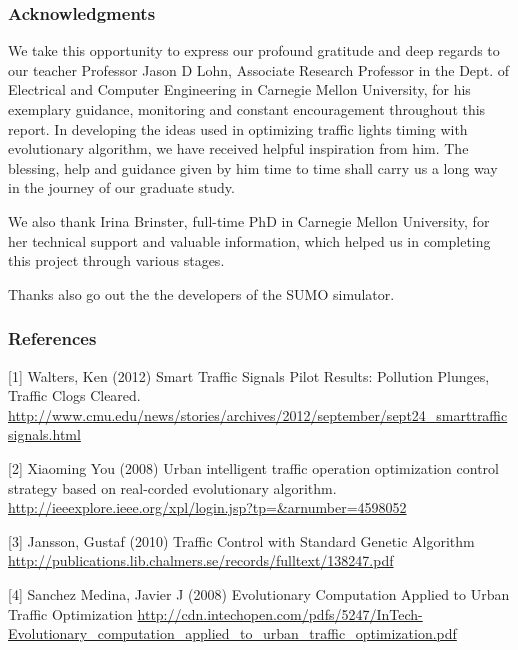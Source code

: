 \documentclass{article} %
\begin{document}
\subsubsection*{Acknowledgments}

We take this opportunity to express our profound gratitude and deep regards to our teacher Professor Jason D Lohn, Associate Research Professor in the Dept. of Electrical and Computer Engineering in Carnegie Mellon University, for his exemplary guidance, monitoring and constant encouragement throughout this report. In developing the ideas used in optimizing traffic lights timing with evolutionary algorithm, we have received helpful inspiration from him. The blessing, help and guidance given by him time to time shall carry us a long way in the journey of our graduate study.

We also thank Irina Brinster, full-time PhD in Carnegie Mellon University, for her technical support and valuable information, which helped us in completing this project  through various stages.

Thanks also go out the the developers of the SUMO simulator.

\subsubsection*{References}

\small{
[1] Walters, Ken (2012) Smart Traffic Signals Pilot Results: Pollution Plunges, Traffic Clogs Cleared. \url{http://www.cmu.edu/news/stories/archives/2012/september/sept24_smarttrafficsignals.html}

[2] Xiaoming You (2008) Urban intelligent traffic operation optimization control strategy based on real-corded evolutionary algorithm. \url{http://ieeexplore.ieee.org/xpl/login.jsp?tp=&arnumber=4598052}

[3] Jansson, Gustaf (2010) Traffic Control with Standard Genetic Algorithm \url{http://publications.lib.chalmers.se/records/fulltext/138247.pdf}

[4] Sanchez Medina, Javier J (2008) Evolutionary Computation Applied to Urban Traffic Optimization \url{http://cdn.intechopen.com/pdfs/5247/InTech-Evolutionary_computation_applied_to_urban_traffic_optimization.pdf}
}
\end{document}
